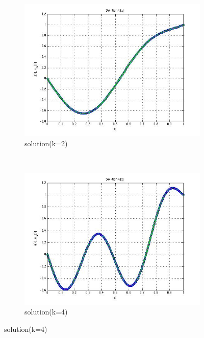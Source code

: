 \documentclass[paper=a4, fontsize=11pt]{article} %
\begin{document}
\begin{figure}
        \centering
        \begin{subfigure}[b]{0.45\textwidth}
                \includegraphics[width=\textwidth]{solutionk2.jpg}
                \caption{solution(k=2)}
                \label{fig:k2}
        \end{subfigure}%
        ~ %
        \begin{subfigure}[b]{0.45\textwidth}
                \includegraphics[width=\textwidth]{solutionk4.jpg}
                \caption{solution(k=4)}
                \label{fig:k4}

\end{subfigure}
\end{figure}
\end{document}
